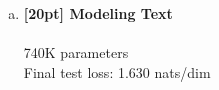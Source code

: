\documentclass{article}
\begin{document}
\newpage
{}

\begin{enumerate}[(a)]
\item {\bf [20pt] Modeling Text} \\\\
740K parameters \\
Final test loss: 1.630 nats/dim
\begin{figure}[H]
    \centering
\end{figure}

\begin{figure}[H]
    \centering
\end{figure}


\end{enumerate}
\end{document}
